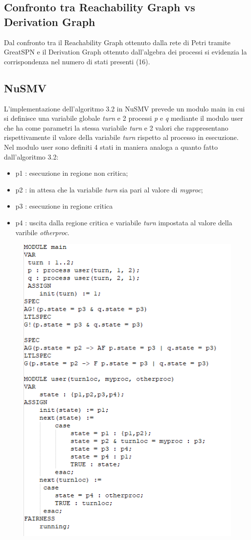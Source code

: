 \documentclass{article}
\begin{document}
\subsection{Confronto tra Reachability Graph vs Derivation Graph}
Dal confronto tra il Reachability Graph ottenuto dalla rete di Petri tramite GreatSPN e il Derivation Graph ottenuto dall'algebra dei processi si evidenzia la corrispondenza nel numero di stati presenti (16). 
\clearpage
\subsection{NuSMV}
L'implementazione dell'algoritmo 3.2 in NuSMV prevede un modulo main in cui si definisce una variabile globale \textit{turn} e 2 processi \textit{p} e \textit{q} mediante il modulo user che ha come parametri la stessa variabile \textit{turn} e 2 valori che rappresentano rispettivamente il valore della variabile \textit{turn} rispetto al processo in esecuzione. 
\\Nel modulo user sono definiti 4 stati in maniera analoga a quanto fatto dall'algoritmo 3.2:
\begin{itemize}
    \item p1 : esecuzione in regione non critica;
    \item p2 : in attesa che la variabile \textit{turn} sia pari al valore di \textit{myproc};
    \item p3 : esecuzione in regione critica
    \item p4 : uscita dalla regione critica e variabile \textit{turn} impostata al valore della varibile \textit{otherproc}.
\end{itemize}
\begin{figure}[h] 
\centering
\includegraphics[scale=1.1]{3.2nusmv.png}
\end{figure}
\end{document}
